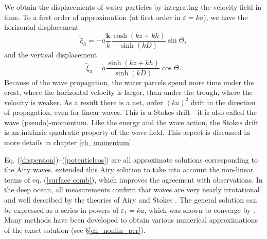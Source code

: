 

We obtain the displacements of water particles by integrating the velocity field in 
time. To a first order of approximation (at first order in $\varepsilon=ka$),
we have the horizontal displacement
\begin{equation}
     \widetilde{\xi}_h = - a \frac{{\mathbf k}}{k}
    \frac{\cosh\left(kz+kh\right)}{\sinh\left(kD\right)}
    \sin \Theta,
      \label{xi1}
\end{equation} and the vertical displacement
\begin{equation}
    \widetilde{\xi}_3 =a
    \frac{\sinh\left(kz+kh\right)}{\sinh\left(kD\right)}
    \cos \Theta \label{xi3}.
\end{equation}
Because of the wave propagation, the water parcels spend more time under the crest, where the horizontal 
velocity is larger, than under the trough, where the velocity is weaker. As a result there is a net, order $(ka)^2$ drift in the direction 
of propagation, even for linear waves. This is a Stokes drift - it is also called the wave (pseudo)-momentum. Like the energy and the wave action, the Stokes 
drift is an intrinsic quadratic property 
of the wave field. This aspect is discussed in more details in chapter \ref{ch_momentum}. 

Eq. (\ref{dispersion})--(\ref{potentielcos}) are all approximate solutions corresponding to the Airy waves. \cite{Stokes1849} extended this Airy solution 
to take into account the non-linear terms of eq. 
(\ref{surface comb}), which improves the agreement with observations.
In the deep ocean, all measurements confirm that waves are very nearly irrotational and well described
by the theories of Airy and Stokes
\citep[see for example ][]{Thornton&Kraphol1974,Herbers&al.1992}. The general solution can be expressed as a 
series in powers of 
$\varepsilon_1=ka$, which was shown to converge by \cite{Levi-Civita1925}. Many methods have been developed to 
obtain various numerical approximations of the exact solution (see \S\ref{ch_nonlin_per}).

